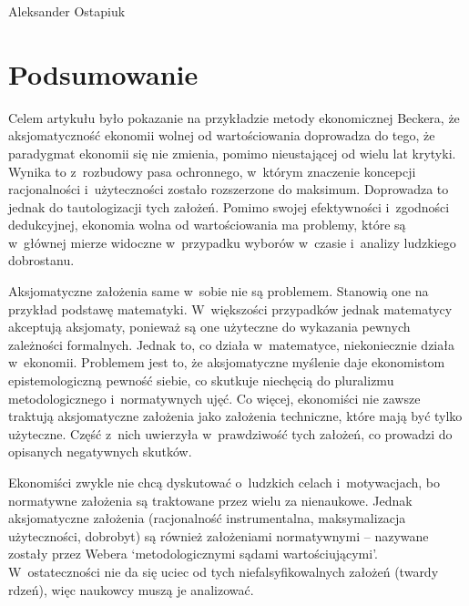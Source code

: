 \begin{artplenv}{Aleksander Ostapiuk}
\section*{Podsumowanie}
Celem artykułu było pokazanie na przykładzie metody ekonomicznej Beckera, że aksjomatyczność ekonomii wolnej od
wartościowania doprowadza do tego, że paradygmat ekonomii się nie zmienia, pomimo nieustającej od wielu lat krytyki.
Wynika to z~rozbudowy pasa ochronnego, w~którym znaczenie koncepcji racjonalności i~użyteczności zostało rozszerzone do
maksimum. Doprowadza to jednak do tautologizacji tych założeń. Pomimo swojej efektywności i~zgodności dedukcyjnej,
ekonomia wolna od wartościowania ma problemy, które są w~głównej mierze widoczne w~przypadku wyborów w~czasie i~analizy
ludzkiego dobrostanu.

Aksjomatyczne założenia same w~sobie nie są problemem. Stanowią one na przykład podstawę matematyki. W~większości
przypadków jednak matematycy akceptują aksjomaty, ponieważ są one użyteczne do wykazania pewnych zależności formalnych.
Jednak to, co działa w~matematyce, niekoniecznie działa w~ekonomii. Problemem jest to, że aksjomatyczne myślenie daje
ekonomistom epistemologiczną pewność siebie, co skutkuje niechęcią do pluralizmu metodologicznego i~normatywnych ujęć.
Co więcej, ekonomiści nie zawsze traktują aksjomatyczne założenia jako założenia techniczne, które mają być tylko
użyteczne. Część z~nich uwierzyła w~prawdziwość tych założeń, co prowadzi do opisanych negatywnych skutków.

Ekonomiści zwykle nie chcą dyskutować o~ludzkich celach i~motywacjach, bo normatywne założenia są traktowane przez wielu
za nienaukowe. Jednak aksjomatyczne założenia (racjonalność instrumentalna, maksymalizacja użyteczności, dobrobyt) są
również założeniami normatywnymi -- nazywane zostały przez Webera
\parencite*{weber_methodology_1949}
`metodologicznymi
sądami wartościującymi'. W~ostateczności nie da się uciec od tych niefalsyfikowalnych założeń (twardy rdzeń), więc
naukowcy muszą je analizować.


\end{artplenv}
